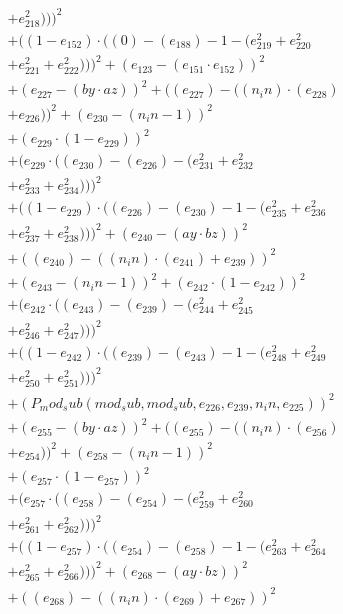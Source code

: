 \documentclass[10pt, a4paper]{article}
\begin{document}
\begin{align*}
& + e_{218}^{2})))^{2} \\
& + ((1 - e_{152})  \cdot  ((0) - (e_{188}) - 1 - (e_{219}^{2} + e_{220}^{2} \\
& + e_{221}^{2} + e_{222}^{2})))^{2} + (e_{123} - (e_{151}  \cdot  e_{152}))^{2} \\
& + (e_{227} - (by  \cdot  az))^{2} + ((e_{227}) - ((n_in)  \cdot  (e_{228}) \\
& + e_{226}))^{2} + (e_{230} - (n_in - 1))^{2} \\
& + (e_{229}  \cdot  (1 - e_{229}))^{2} \\
& + (e_{229}  \cdot  ((e_{230}) - (e_{226}) - (e_{231}^{2} + e_{232}^{2} \\
& + e_{233}^{2} + e_{234}^{2})))^{2} \\
& + ((1 - e_{229})  \cdot  ((e_{226}) - (e_{230}) - 1 - (e_{235}^{2} + e_{236}^{2} \\
& + e_{237}^{2} + e_{238}^{2})))^{2} + (e_{240} - (ay  \cdot  bz))^{2} \\
& + ((e_{240}) - ((n_in)  \cdot  (e_{241}) + e_{239}))^{2} \\
& + (e_{243} - (n_in - 1))^{2} + (e_{242}  \cdot  (1 - e_{242}))^{2} \\
& + (e_{242}  \cdot  ((e_{243}) - (e_{239}) - (e_{244}^{2} + e_{245}^{2} \\
& + e_{246}^{2} + e_{247}^{2})))^{2} \\
& + ((1 - e_{242})  \cdot  ((e_{239}) - (e_{243}) - 1 - (e_{248}^{2} + e_{249}^{2} \\
& + e_{250}^{2} + e_{251}^{2})))^{2} \\
& + (P_mod_sub(mod_sub, mod_sub, e_{226}, e_{239}, n_in, e_{225}))^{2} \\
& + (e_{255} - (by  \cdot  az))^{2} + ((e_{255}) - ((n_in)  \cdot  (e_{256}) \\
& + e_{254}))^{2} + (e_{258} - (n_in - 1))^{2} \\
& + (e_{257}  \cdot  (1 - e_{257}))^{2} \\
& + (e_{257}  \cdot  ((e_{258}) - (e_{254}) - (e_{259}^{2} + e_{260}^{2} \\
& + e_{261}^{2} + e_{262}^{2})))^{2} \\
& + ((1 - e_{257})  \cdot  ((e_{254}) - (e_{258}) - 1 - (e_{263}^{2} + e_{264}^{2} \\
& + e_{265}^{2} + e_{266}^{2})))^{2} + (e_{268} - (ay  \cdot  bz))^{2} \\
& + ((e_{268}) - ((n_in)  \cdot  (e_{269}) + e_{267}))^{2} \\

\end{align*}
\end{document}
